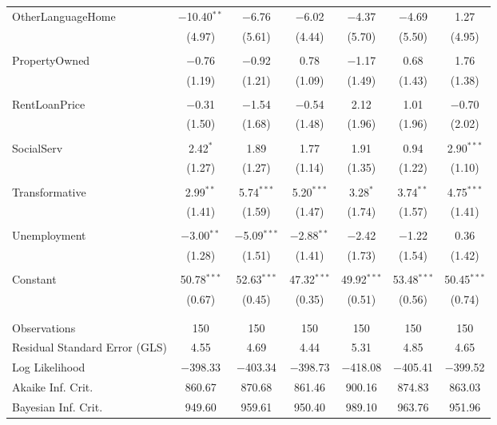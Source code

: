\documentclass[openany]{book}
\begin{document}
\begin{table}[!htbp]
\begin{tabular}{@{\extracolsep{1pt}}lcccccc}
 OtherLanguageHome & $-$10.40$^{**}$ & $-$6.76 & $-$6.02 & $-$4.37 & $-$4.69 & 1.27 \\ 
  & (4.97) & (5.61) & (4.44) & (5.70) & (5.50) & (4.95) \\ 
  & & & & & & \\ 
 PropertyOwned & $-$0.76 & $-$0.92 & 0.78 & $-$1.17 & 0.68 & 1.76 \\ 
  & (1.19) & (1.21) & (1.09) & (1.49) & (1.43) & (1.38) \\ 
  & & & & & & \\ 
 RentLoanPrice & $-$0.31 & $-$1.54 & $-$0.54 & 2.12 & 1.01 & $-$0.70 \\ 
  & (1.50) & (1.68) & (1.48) & (1.96) & (1.96) & (2.02) \\ 
  & & & & & & \\ 
 SocialServ & 2.42$^{*}$ & 1.89 & 1.77 & 1.91 & 0.94 & 2.90$^{***}$ \\ 
  & (1.27) & (1.27) & (1.14) & (1.35) & (1.22) & (1.10) \\ 
  & & & & & & \\ 
 Transformative & 2.99$^{**}$ & 5.74$^{***}$ & 5.20$^{***}$ & 3.28$^{*}$ & 3.74$^{**}$ & 4.75$^{***}$ \\ 
  & (1.41) & (1.59) & (1.47) & (1.74) & (1.57) & (1.41) \\ 
  & & & & & & \\ 
 Unemployment & $-$3.00$^{**}$ & $-$5.09$^{***}$ & $-$2.88$^{**}$ & $-$2.42 & $-$1.22 & 0.36 \\ 
  & (1.28) & (1.51) & (1.41) & (1.73) & (1.54) & (1.42) \\ 
  & & & & & & \\ 
 Constant & 50.78$^{***}$ & 52.63$^{***}$ & 47.32$^{***}$ & 49.92$^{***}$ & 53.48$^{***}$ & 50.45$^{***}$ \\ 
  & (0.67) & (0.45) & (0.35) & (0.51) & (0.56) & (0.74) \\ 
  & & & & & & \\ 
\hline \\[-1.8ex] 
Observations & 150 & 150 & 150 & 150 & 150 & 150 \\ 
Residual Standard Error (GLS) & 4.55 & 4.69 & 4.44 & 5.31 & 4.85 & 4.65 \\ 
Log Likelihood & $-$398.33 & $-$403.34 & $-$398.73 & $-$418.08 & $-$405.41 & $-$399.52 \\ 
Akaike Inf. Crit. & 860.67 & 870.68 & 861.46 & 900.16 & 874.83 & 863.03 \\ 
Bayesian Inf. Crit. & 949.60 & 959.61 & 950.40 & 989.10 & 963.76 & 951.96 \\ 

\end{tabular}
\end{table}
\end{document}

